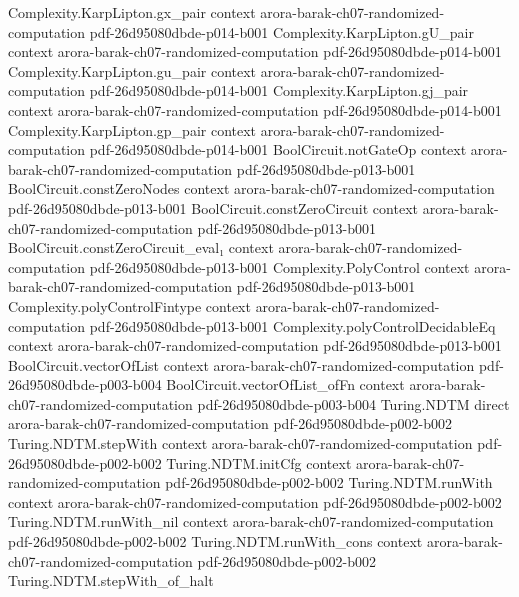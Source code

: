 \begin{theorem}
\proofstep
  {Complexity.KarpLipton.gx_pair}
  {context}
  {arora-barak-ch07-randomized-computation}
  {pdf-26d95080dbde-p014-b001}
\proofstep
  {Complexity.KarpLipton.gU_pair}
  {context}
  {arora-barak-ch07-randomized-computation}
  {pdf-26d95080dbde-p014-b001}
\proofstep
  {Complexity.KarpLipton.gu_pair}
  {context}
  {arora-barak-ch07-randomized-computation}
  {pdf-26d95080dbde-p014-b001}
\proofstep
  {Complexity.KarpLipton.gj_pair}
  {context}
  {arora-barak-ch07-randomized-computation}
  {pdf-26d95080dbde-p014-b001}
\proofstep
  {Complexity.KarpLipton.gp_pair}
  {context}
  {arora-barak-ch07-randomized-computation}
  {pdf-26d95080dbde-p014-b001}
\proofstep
  {BoolCircuit.notGateOp}
  {context}
  {arora-barak-ch07-randomized-computation}
  {pdf-26d95080dbde-p013-b001}
\proofstep
  {BoolCircuit.constZeroNodes}
  {context}
  {arora-barak-ch07-randomized-computation}
  {pdf-26d95080dbde-p013-b001}
\proofstep
  {BoolCircuit.constZeroCircuit}
  {context}
  {arora-barak-ch07-randomized-computation}
  {pdf-26d95080dbde-p013-b001}
\proofstep
  {BoolCircuit.constZeroCircuit_eval₁}
  {context}
  {arora-barak-ch07-randomized-computation}
  {pdf-26d95080dbde-p013-b001}
\proofstep
  {Complexity.PolyControl}
  {context}
  {arora-barak-ch07-randomized-computation}
  {pdf-26d95080dbde-p013-b001}
\proofstep
  {Complexity.polyControlFintype}
  {context}
  {arora-barak-ch07-randomized-computation}
  {pdf-26d95080dbde-p013-b001}
\proofstep
  {Complexity.polyControlDecidableEq}
  {context}
  {arora-barak-ch07-randomized-computation}
  {pdf-26d95080dbde-p013-b001}
\proofstep
  {BoolCircuit.vectorOfList}
  {context}
  {arora-barak-ch07-randomized-computation}
  {pdf-26d95080dbde-p003-b004}
\proofstep
  {BoolCircuit.vectorOfList_ofFn}
  {context}
  {arora-barak-ch07-randomized-computation}
  {pdf-26d95080dbde-p003-b004}
\proofstep
  {Turing.NDTM}
  {direct}
  {arora-barak-ch07-randomized-computation}
  {pdf-26d95080dbde-p002-b002}
\proofstep
  {Turing.NDTM.stepWith}
  {context}
  {arora-barak-ch07-randomized-computation}
  {pdf-26d95080dbde-p002-b002}
\proofstep
  {Turing.NDTM.initCfg}
  {context}
  {arora-barak-ch07-randomized-computation}
  {pdf-26d95080dbde-p002-b002}
\proofstep
  {Turing.NDTM.runWith}
  {context}
  {arora-barak-ch07-randomized-computation}
  {pdf-26d95080dbde-p002-b002}
\proofstep
  {Turing.NDTM.runWith_nil}
  {context}
  {arora-barak-ch07-randomized-computation}
  {pdf-26d95080dbde-p002-b002}
\proofstep
  {Turing.NDTM.runWith_cons}
  {context}
  {arora-barak-ch07-randomized-computation}
  {pdf-26d95080dbde-p002-b002}
\proofstep
  {Turing.NDTM.stepWith_of_halt}

\end{theorem}
